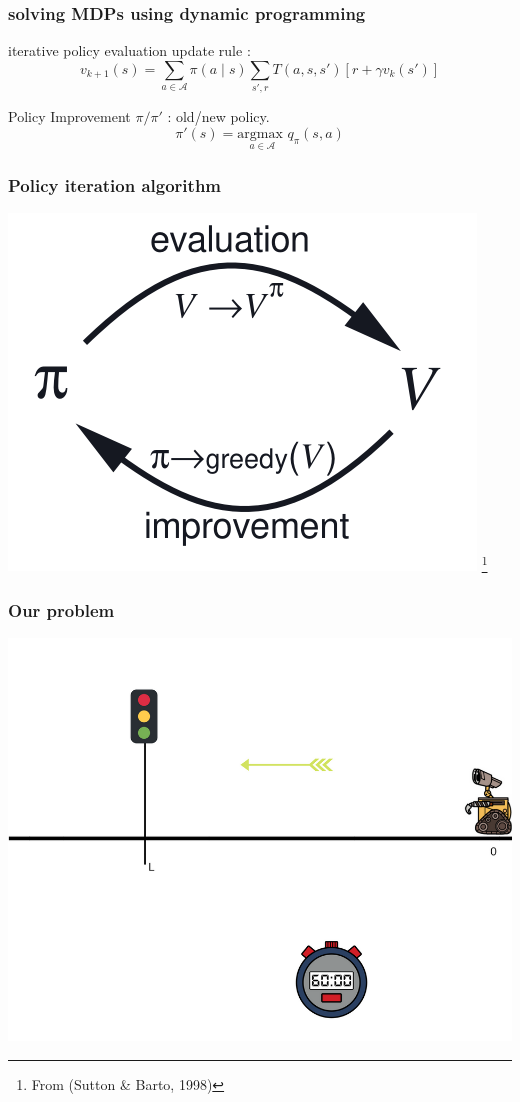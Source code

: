 \documentclass[dvipsnames,svgnames]{beamer}
\begin{document}
\begin{frame}
\frametitle{solving MDPs using dynamic programming}
\begin{block}{iterative policy evaluation}
update rule : 
$$ v_{k+1}(s)=\sum_{a \in \mathcal{A}}\pi(a \mid s)\sum_{s',r}T(a,s,s')\left[r+\gamma v_k(s')\right] $$
\end{block}
\pause
\begin{block}{Policy Improvement}
$\pi/\pi'$ : old/new policy.
$$\pi'(s) = \underset{a \in \mathcal{A}}{\text{argmax } } q_{\pi}(s,a) $$
\end{block}

\end{frame}


\begin{frame}
\frametitle{Policy iteration algorithm}
\centering
\includegraphics[scale=0.7]{img/policy_iter_sutton.png}
\footnote{From (Sutton \& Barto, 1998)}

\end{frame}


\begin{frame}
\frametitle{Our problem}
\begin{center}
\includegraphics[scale=0.4]{img/illustration_traffic_light.png}
\end{center}
\end{frame}
\end{document}
